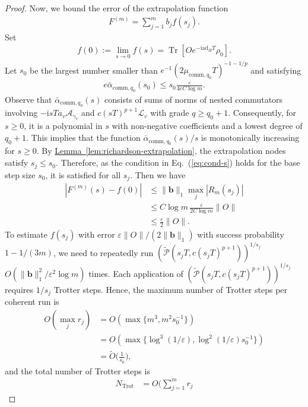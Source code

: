 \documentclass[aps,pra,reprint,groupedaddress,floatfix]{revtex4-2}
\newcommand{\eq}[1]{(\ref{eq:#1})}
\newcommand{\lem}[1]{\hyperref[lem:#1]{Lemma~\ref*{lem:#1}}}
\renewcommand{\i}{\mathrm{i}}
\newcommand{\ad}{\mathrm{ad}}
\newcommand{\eps}{\varepsilon}
\newcommand{\mc}{\mathcal}
\begin{document}
\begin{proof}
    Now, we bound the error of the extrapolation function \begin{align*}
        F^{(m)} = \sum_{j=1}^m b_j f(s_j).
    \end{align*}
    Set \begin{align*}
        f(0) :=\lim_{s\to 0} f(s) = \operatorname{Tr}[Oe^{-\i \ad_H T}\rho_0].
    \end{align*} Let $s_0$ be the largest number smaller than $e^{-1}(2\mu_{\mathrm{comm},q_0}T)^{-1-1/p}$ and satisfying \begin{align*}
        e\bar\alpha_{\mathrm{comm},q_0}(s_0)\le s_0\frac{\eps}{4eC \log m}.
    \end{align*}
    Observe that $\bar\alpha_{\mathrm{comm}, q_0}(s)$ consists of sums of norms of nested commutators involving $-\i sT a_v \mc{A}_{\gamma_v}$ and $c(sT)^{p+1} \mc L_{v}$ with grade $q \ge q_0+1$. Consequently, for $s \ge 0$, it is a polynomial in $s$ with non-negative coefficients and a lowest degree of $q_0+1$. This implies that the function $\bar\alpha_{\mathrm{comm}, q_0}(s)/s$ is monotonically increasing for $s \ge 0$. 
    By \lem{richardson-extrapolation}, the extrapolation nodes satisfy $s_j \le s_0$. Therefore, as the condition in Eq.~\eq{cond-s} holds for the base step size $s_0$, it is satisfied for all $s_j$.
    Then we have
    \begin{align*}
        |F^{(m)}(s)-f(0)|
        &\le \|\mathbf{b}\|_1 \max_j|R_m(s_j)| \\
        &\le C\log m\,\frac{\eps}{2C\log m}\|O\|\\
        &\le \frac{\eps}{2}\|O\|.
    \end{align*}
    To estimate $f(s_j)$ with error $\eps\|O\|/(2\|\mathbf{b}\|_1)$ with success probability $1-1/(3m)$, we need to repeatedly run $(\tilde{\mc P}(s_jT, c(s_jT)^{p+1}))^{1/s_j}$ $O(\|\mathbf{b}\|_1^2/\eps^2\log m)$ times.  Each application of $(\tilde{\mc P}(s_jT, c(s_jT)^{p+1}))^{1/s_j}$ requires $1/s_j$ Trotter steps. Hence, the maximum number of Trotter steps per coherent run is \begin{align*}
        O(\max_j r_j) & = O( \max\{m^3, m^2s_0^{-1}\})\\
        &=O( \max\{\log^3(1/\eps), \log^2(1/\eps)s_0^{-1}\}) \\
        &= \widetilde{O}\Big(\frac{1}{s_0}\Big),
    \end{align*} and the total number of Trotter steps is
    \begin{align*}
        N_{\mathrm{Trot}}
        &=
        O\Big(\sum_{j=1}^m r_j

\end{align*}
\end{proof}
\end{document}
